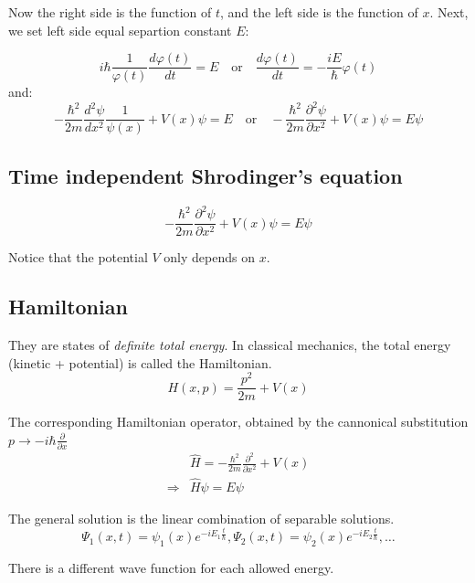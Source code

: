 \documentclass{article}
\begin{document}
Now the right side is the function of \(t\), and the left side is the function of \(x\). Next, we set left side equal separtion constant \(E\):

\begin{equation}
    i\hbar \frac{1}{\varphi(t)} \frac{d\varphi(t)}{dt} = E \quad \text{or} \quad \frac{d\varphi(t)}{dt} = -\frac{iE}{\hbar}\varphi(t)
\end{equation}
and:
\begin{equation}
    -\frac{\hbar^2}{2m} \frac{d^2 \psi}{dx^2} \frac{1}{\psi(x)} + V(x)\psi = E \quad \text{or} \quad -\frac{\hbar^2}{2m} \frac{\partial^2\psi}{\partial x^2} + V(x)\psi = E\psi
\end{equation}

\subsection*{Time independent Shrodinger's equation}


\begin{equation}
    -\frac{\hbar^2}{2m} \frac{\partial^2\psi}{\partial x^2} + V(x)\psi = E\psi
\end{equation}

Notice that the potential \(V\) only depends on \(x\).
\subsection*{Hamiltonian}

They are states of \emph{definite total energy}. In classical mechanics, the total energy (kinetic + potential) is called the Hamiltonian.
\begin{equation}
    H(x,p) = \frac{p^2}{2m} + V(x)
\end{equation} 

\noindent The corresponding Hamiltonian operator, obtained by the cannonical substitution \(p \rightarrow -i\hbar \frac{\partial}{\partial x}\)
\begin{align}
    &\hat{H} = -\frac{\hbar^2}{2m} \frac{\partial^2}{\partial x^2} + V(x) \\
            \Rightarrow &\hat{H} \psi = E \psi
\end{align}

The general solution is the linear combination of separable solutions. 
\[\Psi_1(x,t) = \psi_1(x)e^{-iE_1\frac{t}{\hbar}}, \Psi_2(x,t) = \psi_2(x)e^{-iE_2\frac{t}{\hbar}}, \dots\] 

There is a different wave function for each allowed energy. \newline
\end{document}

